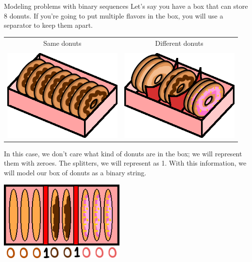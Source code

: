     \begin{intro}{Modeling problems with binary sequences}
        Let's say you have a box that can store 8 donuts.
        If you're going to put multiple flavors in the box, you will
        use a separator to keep them apart.

        \begin{center}
            \begin{tabular}{c c}
                Same donuts & 
                Different donuts
                \\ \\
                \centering
                \includegraphics[width=6cm]{images/donutbox1.png}
                &
                \includegraphics[width=6cm]{images/donutbox2.png}
            \end{tabular}
        \end{center}

        In this case, we don't care what kind of donuts are in the box;
        we will represent them with zeroes. The splitters, we will represent as 1.
        With this information, we will model our box of donuts as a binary string.

        \begin{center}
            \includegraphics[height=4cm]{images/donutbox3.png}
        \end{center}
    \end{intro}
    
